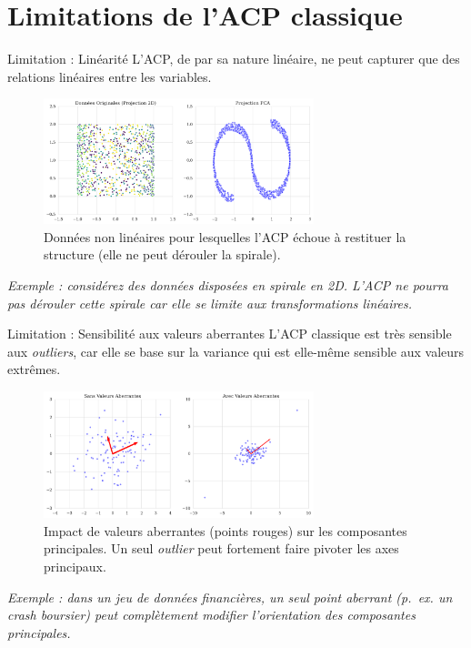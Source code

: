 \documentclass{beamer}
\begin{document}
\section{Limitations de l'ACP classique}

\begin{frame}{Limitation : Linéarité}
L'ACP, de par sa nature linéaire, ne peut capturer que des relations linéaires entre les variables.

\begin{figure}
\centering
\includegraphics[width=0.7\textwidth]{nonlinear_pca_fail.png}
\caption{Données non linéaires pour lesquelles l'ACP échoue à restituer la structure (elle ne peut \og dérouler \fg{} la spirale).}
\end{figure}

\textit{Exemple : considérez des données disposées en spirale en 2D. L'ACP ne pourra pas dérouler cette spirale car elle se limite aux transformations linéaires.}
\end{frame}

\begin{frame}{Limitation : Sensibilité aux valeurs aberrantes}
L'ACP classique est très sensible aux \emph{outliers}, car elle se base sur la variance qui est elle-même sensible aux valeurs extrêmes.

\begin{figure}
\centering
\includegraphics[width=0.7\textwidth]{outliers_impact.png}
\caption{Impact de valeurs aberrantes (points rouges) sur les composantes principales. Un seul \emph{outlier} peut fortement faire pivoter les axes principaux.}
\end{figure}

\textit{Exemple : dans un jeu de données financières, un seul point aberrant (p.~ex. un crash boursier) peut complètement modifier l'orientation des composantes principales.}
\end{frame}
\end{document}
